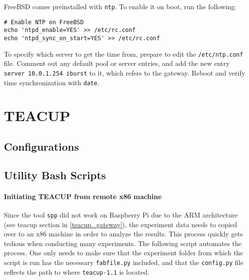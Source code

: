 FreeBSD comes preinstalled with \lstinline{ntp}. To enable it on boot, run the following:

\begin{verbatim}
# Enable NTP on FreeBSD
echo 'ntpd_enable=YES' >> /etc/rc.conf
echo 'ntpd_sync_on_start=YES' >> /etc/rc.conf
\end{verbatim}

To specify which server to get the time from, prepare to edit the \lstinline{/etc/ntp.conf} file. Comment out any default pool or server entries, and add the new entry \lstinline{server 10.0.1.254 iburst} to it, which refers to the gateway. Reboot and verify time synchronization with \lstinline{date}.



















\chapter{TEACUP}


\section{Configurations} \label{teacup_configs}









\section{Utility Bash Scripts}


\subsubsection{Initiating TEACUP from remote x86 machine}

Since the tool \lstinline{spp} did not work on Raspberry Pi due to the ARM architecture (see \gls{teacup} section in \ref{teacup_gateway}), the experiment data needs to copied over to an x86 machine in order to analyze the results. This process quickly gets tedious when conducting many experiments. The following script automates the process. One only needs to make sure that the experiment folder from which the script is run has the necessary \lstinline{fabfile.py} included, and that the \lstinline{config.py} file reflects the path to where \lstinline{teacup-1.1} is located.

